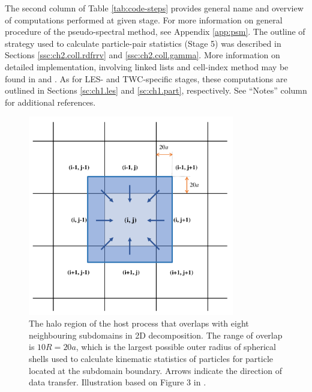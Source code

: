 \documentclass{pracamgren}
\begin{document}
The second column of Table \ref{tab:code-steps} provides general name and overview of computations performed at given stage.
For more information on general procedure of the pseudo-spectral method, see Appendix \ref{app:psm}.
The outline of strategy used to calculate particle-pair statistics (Stage 5) was described in Sections \ref{ssc:ch2.coll.rdfrrv} and \ref{ssc:ch2.coll.gamma}.
More information on detailed implementation, involving linked lists and cell-index method may be found in \textcite{Allen1987} and \textcite{Onishi2013}.
As for LES- and TWC-specific stages, these computations are outlined in Sections \ref{sc:ch1.les} and \ref{sc:ch1.part}, respectively.
See ``Notes'' column for additional references.

\begin{figure}[h]
\centering
\includegraphics[width=9cm]{figures/3-01_halo.pdf}
\caption{
The halo region of the host process that overlaps with eight neighbouring subdomains in 2D decomposition.
The range of overlap is $10R = 20a$, which is the largest possible outer radius of spherical shells used to calculate kinematic statistics of particles for particle located at the subdomain boundary.
Arrows indicate the direction of data transfer.
Illustration based on Figure 3 in \textcite{Ayala2014}. 
}
\label{fig:halo}
\end{figure}
\end{document}
